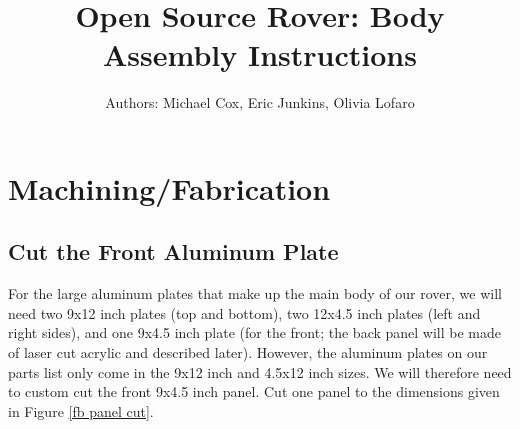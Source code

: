 \documentclass[12pt]{article}
\begin{document}
\title{Open Source Rover: Body Assembly Instructions}
\author{Authors: Michael Cox, Eric Junkins, Olivia Lofaro}

\makeatletter         
\def\@maketitle{
\begin{center}	
	\makebox[\textwidth][c]{ \texttt{[image: "Pictures/Body/Body title".png]}}
	{\Huge \bfseries \sffamily \@title }\\[3ex] 
	{\Large \sffamily \@author}\\[3ex] 
	\texttt{[image: "Pictures/Misc/JPL logo".png]}
\end{center}}
\makeatother

\maketitle



\newpage


\tableofcontents

\newpage

\section{Machining/Fabrication}
\subsection{Cut the Front Aluminum Plate}

For the large aluminum plates that make up the main body of our rover, we will need two 9x12 inch plates (top and bottom),  two 12x4.5 inch plates (left and right sides), and one 9x4.5 inch plate (for the front; the back panel will be made of laser cut acrylic and described later).  However, the aluminum plates on our parts list only come in the 9x12 inch and 4.5x12 inch sizes.  We will therefore need to custom cut the front 9x4.5 inch panel.  Cut one panel to the dimensions given in  Figure \ref{fb panel cut}.

\end{document}
